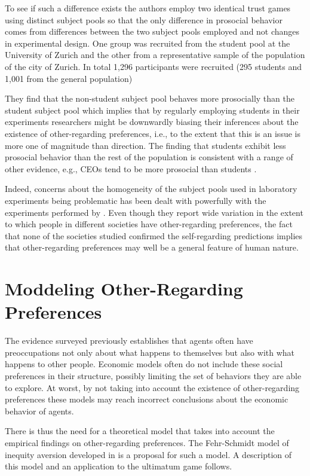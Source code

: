 \documentclass[12pt]{article}
\begin{document}
To see if such a difference exists the authors employ two identical trust games using distinct subject pools so that the only difference in prosocial behavior comes from differences between the two subject pools employed and not changes in experimental design. One group was recruited from the student pool at the University of Zurich and the other from a representative sample of the population of the city of Zurich. In total 1,296 participants were recruited (295 students and 1,001 from the general population) 

They find that the non-student subject pool behaves more prosocially than the student subject pool which implies that by regularly employing students in their experiments researchers might be downwardly biasing their inferences about the existence of other-regarding preferences, i.e., to the extent that this is an issue is more one of magnitude than direction. The finding that students exhibit less prosocial behavior than the rest of the population is consistent with a range of other evidence, e.g., CEOs tend to be more prosocial than students \citep{fehr2004hidden}.

Indeed, concerns about the homogeneity of the subject pools used in laboratory experiments being problematic has been dealt with powerfully with the experiments performed by \cite{henrich2005economic}. Even though they report wide variation in the extent to which people in different societies have other-regarding preferences, the fact that none of the societies studied confirmed the self-regarding predictions implies that other-regarding preferences may well be a general feature of human nature. 


\section{Moddeling Other-Regarding Preferences}

The evidence surveyed previously establishes that agents often have preoccupations not only about what happens to themselves but also with what happens to other people. Economic models often do not include these social preferences in their structure, possibly limiting the set of behaviors they are able to explore. At worst, by not taking into account the existence of other-regarding preferences these models may reach incorrect conclusions about the economic behavior of agents.

There is thus the need for a theoretical model that takes into account the empirical findings on other-regarding preferences. The Fehr-Schmidt model of inequity aversion developed in \cite{Fehr1999} is a proposal for such a model. A description of this model and an application to the ultimatum game follows.
\end{document}
